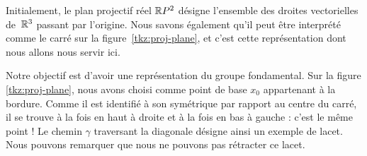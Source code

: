 \begin{exemple}
Initialement, le plan projectif réel $\mathbb{R}P^2$ désigne l'ensemble des droites vectorielles de~$\mathbb{R}^3$ passant par l'origine. Nous savons également qu'il peut être interprété comme le carré sur la figure~\ref{tkz:proj-plane}, et c'est cette représentation dont nous allons nous servir ici.


Notre objectif est d'avoir une représentation du groupe fondamental. Sur la figure \ref{tkz:proj-plane}, nous avons choisi comme point de base $x_0$ appartenant à la bordure. Comme il est identifié à son symétrique par rapport au centre du carré, il se trouve à la fois en haut à droite et à la fois en bas à gauche : c'est le même point ! Le chemin $\gamma$ traversant la diagonale désigne ainsi un exemple de lacet. Nous pouvons remarquer que nous ne pouvons pas rétracter ce lacet.

\begin{figure}[H]
\centering
\begin{subfigure}[t]{0.45\textwidth}
\centering
{}
\end{subfigure}
\end{figure}
\end{exemple}
